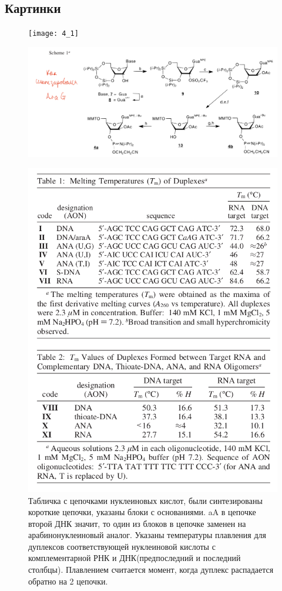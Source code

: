 	\subsection{Картинки}
	\begin{figure}[H]
		\centering
		\texttt{[image: 4\_1]}
	\end{figure}
\begin{figure}[H]
	\centering
	\includegraphics[scale = 0.3]{Pictures/4_2}
\end{figure}
	\begin{figure}[H]
		\centering
		\includegraphics[scale = 0.3]{Pictures/4_3}
		\caption{Табличка с цепочками нуклеиновых кислот, были синтезированы короткие цепочки, указаны блоки с основаниями. aA в цепочке второй ДНК значит,  то один из блоков в цепочке заменен на арабинонуклеиновый аналог.
			Указаны температуры плавления для дуплексов соответствующей нуклеиновой кислоты с комплементарной РНК и ДНК(предпоследний и последний столбцы). Плавлением считается момент, когда дуплекс распадается обратно на 2 цепочки.}
	\end{figure}
